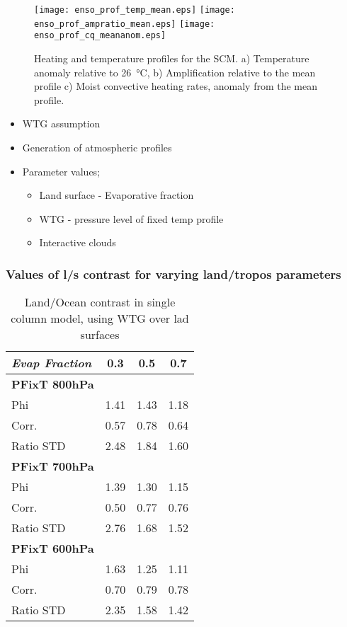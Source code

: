 \begin{figure}[ht]
\texttt{[image: enso\_prof\_temp\_mean.eps]}
\texttt{[image: enso\_prof\_ampratio\_mean.eps]}
\texttt{[image: enso\_prof\_cq\_meananom.eps]}
\caption{Heating and temperature profiles for the SCM. a) Temperature anomaly 
relative to \SI{26}{\degreeCelsius}, b) Amplification relative to the mean 
profile c) Moist convective heating rates, anomaly from the mean profile.}
\label{fig:scmsstprof}
\end{figure}

\begin{itemize}
	\item WTG assumption
	\item Generation of atmospheric profiles
	\item Parameter values;
		\begin{itemize}
			\item Land surface - Evaporative fraction
			\item WTG - pressure level of fixed temp profile
			\item Interactive clouds
		\end{itemize}
\end{itemize}
\subsubsection{Values of l/s contrast for varying land/tropos parameters}

\begin{center}
	\begin{table}[ht]
		\caption{Land/Ocean contrast in single column model, using WTG over lad 
		surfaces}
		\label{tab:scmphi}
		\scriptsize
	\begin{tabular}{ l  c  c  c }
		\textit{Evap Fraction}		& 0.3   & 0.5  & 0.7 \\ \hline
		\textbf{PFixT 800hPa}\\%
	Phi  							& 1.41  & 1.43 & 1.18\\ %
	Corr.							& 0.57  & 0.78 & 0.64\\ %
	Ratio STD           			& 2.48  & 1.84 & 1.60\\ \hline
		\textbf{PFixT 700hPa}\\%
	Phi  							& 1.39  & 1.30 & 1.15\\ %
	Corr.							& 0.50  & 0.77 & 0.76\\ %
	Ratio STD           			& 2.76  & 1.68 & 1.52\\ \hline
		\textbf{PFixT 600hPa}\\%
	Phi  							& 1.63  & 1.25 & 1.11\\ %
	Corr.							& 0.70  & 0.79 & 0.78\\ %
	Ratio STD           			& 2.35  & 1.58 & 1.42\\ \hline
	\end{tabular}
	\end{table}
\end{center}

